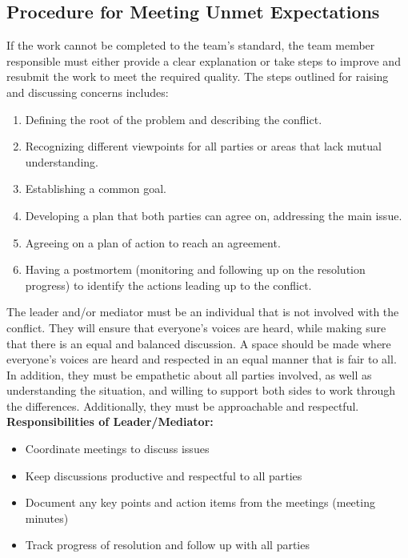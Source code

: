 \documentclass[titlepage]{article}
\begin{document}
\subsection{Procedure for Meeting Unmet Expectations}
If the work cannot be completed to the team’s standard, the team
member responsible
must either provide a clear explanation or take steps to improve and
resubmit the work to
meet the required quality.
The steps outlined for raising and discussing concerns includes:
\begin{enumerate}
  \item Defining the root of the problem and describing the conflict.
  \item Recognizing different viewpoints for all parties or areas
    that lack mutual understanding.
  \item Establishing a common goal.
  \item Developing a plan that both parties can agree on, addressing
    the main issue.
  \item Agreeing on a plan of action to reach an agreement.
  \item Having a postmortem (monitoring and following up on the resolution
    progress) to
    identify the actions leading up to the conflict.
\end{enumerate}

The leader and/or mediator must be an individual that is not involved
with the conflict. They will ensure that everyone’s voices are heard,
while making sure
that there is an equal
and balanced discussion. A space should be made where everyone’s
voices are heard and
respected in an equal manner that is fair to all. In addition, they
must be empathetic about
all parties involved, as well as understanding the situation, and
willing to support both
sides to work through the differences. Additionally, they must be
approachable and
respectful.
\\

\textbf{Responsibilities of Leader/Mediator:}
\begin{itemize}
  \item Coordinate meetings to discuss issues
  \item Keep discussions productive and respectful to all parties
  \item Document any key points and action items from the meetings
    (meeting minutes)
  \item Track progress of resolution and follow up with all parties
\end{itemize}
\end{document}
